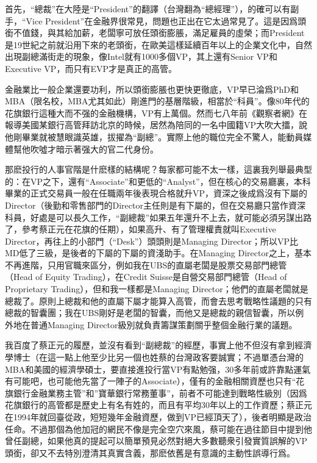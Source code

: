 \documentclass[twocolumn]{ctexart}
\begin{document}
首先，“總裁”在大陸是“President”的翻譯（台灣翻為“總經理”），的確可以有副手，“Vice President”在金融界很常見，問題也正出在它太過常見了。這是因爲頭銜不值錢，與其給加薪，老闆寧可放任頭銜膨脹，滿足雇員的虛榮；而President是19世紀之前就沿用下來的老頭銜，在歐美這樣延續百年以上的企業文化中，自然出現副總滿街走的現象，像Intel就有1000多個VP，其上還有Senior VP和Executive VP，而只有EVP才是真正的高管。

金融業比一般企業還要功利，所以頭銜膨脹也更快更徹底，VP早已淪爲PhD和MBA（限名校，MBA尤其如此）剛進門的基層階級，相當於“科員”。像80年代的花旗銀行這種大而不强的金融機構，VP有上萬個。然而七八年前《觀察者網》在報導美國某銀行高管拜訪北京的時候，居然為陪同的一名中國籍VP大吹大擂，說他剛畢業就被慧眼識英雄，拔擢為“副總”。實際上他的職位完全不驚人，能動員媒體幫他吹噓才暗示著强大的官二代身份。

那麽投行的人事官階是什麽樣的結構呢？每家都可能不太一樣，這裏我列舉最典型的：在VP之下，還有“Associate”和更低的“Analyst”，但在核心的交易廳裏，本科畢業的正式交易員一般在任職兩年後表現合格就升VP，資深之後成爲沒有下屬的Director（後勤和零售部門的Director主任則是有下屬的，但在交易廳只當作資深科員，好處是可以長久工作，“副總裁”如果五年還升不上去，就可能必須另謀出路了，參考蔡正元在花旗的任期），如果高升、有了管理權責就叫Executive Director，再往上的小部門（“Desk”）頭頭則是Managing Director；所以VP比MD低了三級，是後者的下屬的下屬的資淺助手。在Managing Director之上，基本不再進階，只用官職來區分，例如我在UBS的直屬老闆是股票交易部門總管（Head of Equity Trading），在Credit Suisse是自營交易部門總管（Head of Proprietary Trading），但和我一樣都是Managing Director；他們的直屬老闆就是總裁了。原則上總裁和他的直屬下屬才能算入高管，而會去思考戰略性議題的只有總裁的智囊團；我在UBS剛好是老闆的智囊，而他又是總裁的親信智囊，所以例外地在普通Managing Director級別就負責籌謀策劃關乎整個金融行業的議題。

我百度了蔡正元的履歷，並沒有看到“副總裁”的經歷，事實上他不但沒有拿到經濟學博士（在這一點上他至少比另一個也姓蔡的台灣政客要誠實；不過單憑台灣的MBA和美國的經濟學碩士，要直接進投行當VP有點勉强，30多年前或許靠點運氣有可能吧，也可能他先當了一陣子的Associate），僅有的金融相關資歷也只有“花旗銀行金融業務主管”和”寶華銀行常務董事”，前者不可能達到戰略性級別（因爲花旗銀行的高管都是歷史上有名有姓的，而且有平均30年以上的工作資歷；蔡正元在1994年就回臺從政，短短幾年金融資歷，做到VP已經頂天了），後者明顯是政治任命。不過那個為他加冠的網民不像是完全空穴來風，蔡可能在過往節目中提到他曾任副總，如果他真的提起可以簡單預見必然對絕大多數聽衆引發實質誤解的VP頭銜，卻又不去特別澄清其真實含義，那麽依舊是有意識的主動性誤導行爲。
\end{document}
